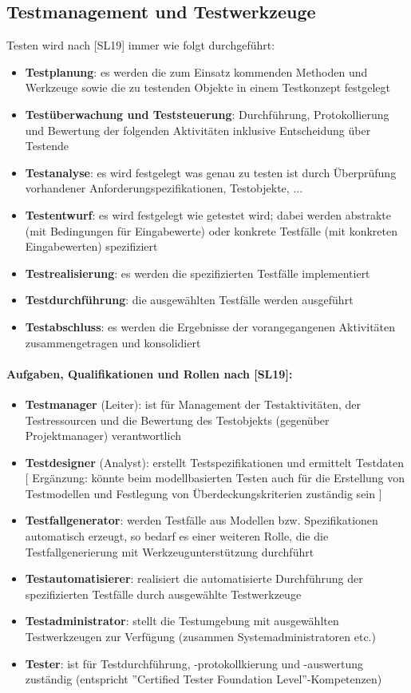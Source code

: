 \subsection{Testmanagement und Testwerkzeuge}
Testen wird nach [SL19] immer wie folgt durchgeführt:
\begin{itemize}
	\item \textbf{Testplanung}: es werden die zum Einsatz kommenden Methoden und Werkzeuge sowie die zu testenden Objekte  in einem Testkonzept festgelegt
	\item \textbf{Testüberwachung und Teststeuerung}: Durchführung, Protokollierung und Bewertung der folgenden Aktivitäten inklusive Entscheidung über Testende
	\item \textbf{Testanalyse}: es wird festgelegt was genau zu testen ist durch Überprüfung vorhandener Anforderungspezifikationen, Testobjekte, ...
	\item \textbf{Testentwurf}: es wird festgelegt wie getestet wird; dabei werden abstrakte (mit Bedingungen für Eingabewerte) oder konkrete Testfälle (mit konkreten Eingabewerten) spezifiziert
	\item \textbf{Testrealisierung}: es werden die spezifizierten Testfälle implementiert
	\item \textbf{Testdurchführung}: die ausgewählten Testfälle werden ausgeführt
	\item \textbf{Testabschluss}: es werden die Ergebnisse der vorangegangenen Aktivitäten zusammengetragen und konsolidiert
\end{itemize}

\paragraph{Aufgaben, Qualifikationen und Rollen nach [SL19]:}
\begin{itemize}
	\item \textbf{Testmanager} (Leiter): ist für Management der Testaktivitäten, der Testressourcen und die Bewertung des Testobjekts (gegenüber Projektmanager) verantwortlich
	\item \textbf{Testdesigner} (Analyst): erstellt Testspezifikationen und ermittelt Testdaten [ Ergänzung: könnte beim modellbasierten Testen auch für die Erstellung von Testmodellen und Festlegung von Überdeckungskriterien zuständig sein ]
	\item \textbf{Testfallgenerator}: werden Testfälle aus Modellen bzw. Spezifikationen automatisch erzeugt, so bedarf es einer weiteren Rolle, die die Testfallgenerierung mit Werkzeugunterstützung durchführt
	\item \textbf{Testautomatisierer}: realisiert die automatisierte Durchführung der spezifizierten Testfälle durch ausgewählte Testwerkzeuge
	\item \textbf{Testadministrator}: stellt die Testumgebung mit ausgewählten Testwerkzeugen zur Verfügung (zusammen Systemadministratoren etc.)
	\item \textbf{Tester}: ist für Testdurchführung, -protokollkierung und -auswertung zuständig (entspricht ''Certified Tester Foundation Level''-Kompetenzen) 
\end{itemize}


